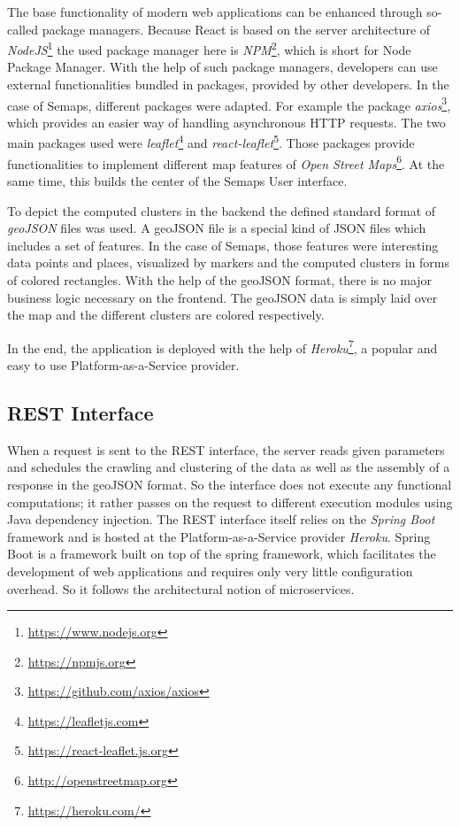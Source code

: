 The base functionality of modern web applications can be enhanced through so-called package managers. Because React is based on the server architecture of \textit{NodeJS}\footnote{ \url{https://www.nodejs.org}} the used package manager here is \textit{NPM}\footnote{ \url{https://npmjs.org}}, which is short for Node Package Manager. With the help of such package managers, developers can use external functionalities bundled in packages, provided by other developers. In the case of Semaps, different packages were adapted. For example the package \textit{axios}\footnote{ \url{https://github.com/axios/axios}}, which provides an easier way of handling asynchronous HTTP requests. The two main packages used were \textit{leaflet}\footnote{ \url{https://leafletjs.com}} and \textit{react-leaflet}\footnote{ \url{https://react-leaflet.js.org}}. Those packages provide functionalities to implement different map features of \textit{Open Street Maps}\footnote{ \url{http://openstreetmap.org}}. At the same time, this builds the center of the Semaps User interface.

To depict the computed clusters in the backend the defined standard format of \textit{geoJSON} files was used. A geoJSON file is a special kind of JSON files which includes a set of features. In the case of Semaps, those features were interesting data points and places, visualized by markers and the computed clusters in forms of colored rectangles. With the help of the geoJSON format, there is no major business logic necessary on the frontend. The geoJSON data is simply laid over the map and the different clusters are colored respectively.

In the end, the application is deployed with the help of \textit{Heroku}\footnote{\url{https://heroku.com/}}, a popular and easy to use Platform-as-a-Service provider.

\subsection{REST Interface}
When a request is sent to the REST interface, the server reads given parameters and schedules the crawling and clustering of the data as well as the assembly of a response in the geoJSON format. So the interface does not execute any functional computations; it rather passes on the request to different execution modules using Java dependency injection. The REST interface itself relies on the \textit{Spring Boot} framework and is hosted at the Platform-as-a-Service provider \textit{Heroku}. Spring Boot is a framework built on top of the spring framework, which facilitates the development of web applications and requires only very little configuration overhead. So it follows the architectural notion of microservices. 


